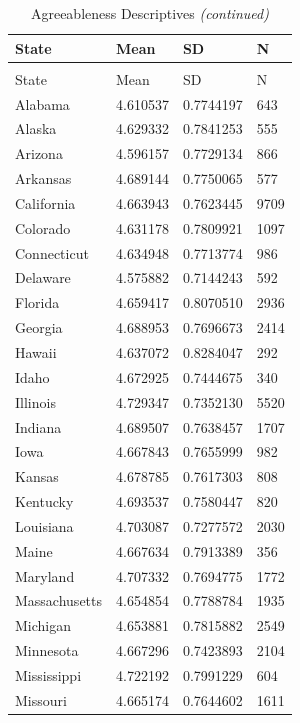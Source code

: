 \documentclass[
  english,
  man]{apa6}
\begin{document}
\begin{landscape}
\begin{longtable}[t]{llll}
\caption{\label{tab:KableOuput}Agreeableness Descriptives}\\
\toprule
State & Mean & SD & N\\
\midrule
\endfirsthead
\caption[]{\label{tab:KableOuput}Agreeableness Descriptives \textit{(continued)}}\\
\toprule
State & Mean & SD & N\\
\midrule
\endhead

\endfoot
\bottomrule
\endlastfoot
Alabama & 4.610537 & 0.7744197 & 643\\
Alaska & 4.629332 & 0.7841253 & 555\\
Arizona & 4.596157 & 0.7729134 & 866\\
Arkansas & 4.689144 & 0.7750065 & 577\\
California & 4.663943 & 0.7623445 & 9709\\
\addlinespace
Colorado & 4.631178 & 0.7809921 & 1097\\
Connecticut & 4.634948 & 0.7713774 & 986\\
Delaware & 4.575882 & 0.7144243 & 592\\
Florida & 4.659417 & 0.8070510 & 2936\\
Georgia & 4.688953 & 0.7696673 & 2414\\
\addlinespace
Hawaii & 4.637072 & 0.8284047 & 292\\
Idaho & 4.672925 & 0.7444675 & 340\\
Illinois & 4.729347 & 0.7352130 & 5520\\
Indiana & 4.689507 & 0.7638457 & 1707\\
Iowa & 4.667843 & 0.7655999 & 982\\
\addlinespace
Kansas & 4.678785 & 0.7617303 & 808\\
Kentucky & 4.693537 & 0.7580447 & 820\\
Louisiana & 4.703087 & 0.7277572 & 2030\\
Maine & 4.667634 & 0.7913389 & 356\\
Maryland & 4.707332 & 0.7694775 & 1772\\
\addlinespace
Massachusetts & 4.654854 & 0.7788784 & 1935\\
Michigan & 4.653881 & 0.7815882 & 2549\\
Minnesota & 4.667296 & 0.7423893 & 2104\\
Mississippi & 4.722192 & 0.7991229 & 604\\
Missouri & 4.665174 & 0.7644602 & 1611\\

\end{longtable}
\end{landscape}
\end{document}
